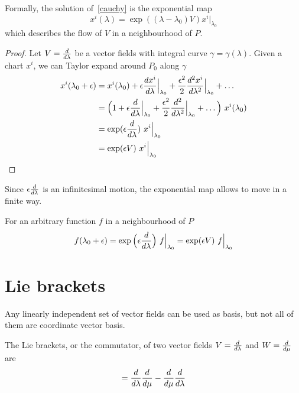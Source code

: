     Formally, the solution of~\eqref{cauchy} is the exponential map
    \begin{equation*}
        x^i(\lambda) = \exp((\lambda - \lambda_0)V) x^i \Big\vert_{\lambda_0}
    \end{equation*}
    which describes the flow of $V$ in a neighbourhood of $P$. 

    \begin{proof}
        Let $V = \frac{d}{d\lambda}$ be a vector fields with integral curve $\gamma = \gamma (\lambda)$. Given a chart $x^i$, we can Taylor expand around $P_0$ along $\gamma$
        \begin{equation*}
        \begin{aligned}
            x^i(\lambda_0 + \epsilon) & = x^i(\lambda_0) + \epsilon \frac{dx^i}{d\lambda} \Big\vert_{\lambda_0} + \frac{\epsilon^2}{2} \frac{d^2x^i}{d\lambda^2} \Big\vert_{\lambda_0} + \ldots \\ & = \Big (1 + \epsilon \frac{d}{d\lambda} \Big\vert_{\lambda_0} + \frac{\epsilon^2}{2} \frac{d^2}{d\lambda^2} \Big\vert_{\lambda_0} + \ldots \Big) ~ x^i(\lambda_0) \\ & = \exp(\epsilon \frac{d}{d\lambda}) ~ x^i \Big\vert_{\lambda_0} \\ & = \exp(\epsilon V) ~ x^i \Big\vert_{\lambda_0} 
        \end{aligned}
        \end{equation*}
    \end{proof}
    \noindent Since $\epsilon \frac{d}{d\lambda}$ is an infinitesimal motion, the exponential map allows to move in a finite way.
    
    For an arbitrary function $f$ in a neighbourhood of $P$
    \begin{equation*}
        f(\lambda_0 + \epsilon) = \exp \Big(\epsilon \frac{d}{d\lambda} \Big) ~ f \Big\vert_{\lambda_0} = \exp (\epsilon V ) ~ f \Big\vert_{\lambda_0}
    \end{equation*}

\section{Lie brackets}

    Any linearly independent set of vector fields can be used as basis, but not all of them are coordinate vector basis. 

    \begin{definition}
        The Lie brackets, or the commutator, of two vector fields $V = \frac{d}{d\lambda}$ and $W=\frac{d}{d\mu}$ are 
        \begin{equation*}
            [V, W] = \dv{}{\lambda} \dv{}{\mu} - \dv{}{\mu} \dv{}{\lambda}
        \end{equation*}
    \end{definition}

